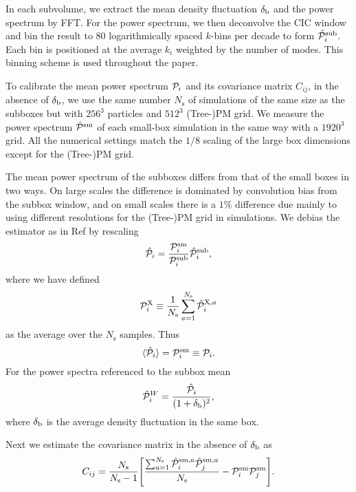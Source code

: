 \documentclass[prd,twocolumn,amsmath,amssymb,floatfix,superscriptaddress]{revtex4-1}
\newcommand{\br}{{\rm b}}
\newcommand{\Dv}{{\cal P}}
\begin{document}
{{In each subvolume, we extract the mean density fluctuation $\delta_\br$
and 
the power spectrum %
by FFT.   For the power spectrum, we then 
deconvolve the CIC window
and bin the result to 80 logarithmically spaced $k$-bins per decade to form 
$\hat \Dv^\textrm{sub}_i$. 
Each bin is positioned at the average $k_i$ weighted by the number of modes.
This binning scheme is used throughout the paper.

To calibrate the mean power spectrum $\Dv_i$ and its covariance matrix $C_{ij}$, in
the absence of $\delta_\br$, 
we use the same number $N_\textrm{s}$ of simulations
of 
the same size as the subboxes but with $256^3$ particles and $512^3$
(Tree-)PM grid.
{We measure the power}
spectrum $\hat \Dv^\textrm{sm}$ of each small-box simulation
in the same way with a $1920^3$ grid. 
All {the numerical}
settings match the $1/8$ scaling of the large box dimensions except
for the (Tree-)PM grid.

The mean power spectrum of the subboxes differs from that of the small boxes in two ways.
On large scales the difference is dominated by  convolution bias from the subbox window,
and on small scales there is a $1\%$ difference due mainly to
using different resolutions for the (Tree-)PM grid in simulations.
We debias the estimator as in Ref \cite{Lietal:14} by rescaling
\begin{equation}
    \hat \Dv_i = \frac{\Dv^\textrm{sm}_i}{\Dv^\textrm{sub}_i}  \hat \Dv^\textrm{sub}_i,
    \label{eq:debias}
\end{equation}
where we have defined 
\begin{equation}
    \Dv^\textrm{X}_i \equiv \frac{1}{N_\textrm{s}} \sum_{a=1}^{N_\textrm{s}}  \hat \Dv_i^{\textrm{X},a}
\end{equation}
as the average over the $N_\textrm{s}$ samples.  Thus 
\begin{equation}
    \langle \hat \Dv_i \rangle =  \Dv^\textrm{sm}_i \equiv  \Dv_i.
\end{equation}
For the power spectra referenced to the subbox mean
\begin{equation}
    \hat \Dv_i^W = \frac{\hat \Dv_i}{(1+\delta_\br)^2},
\end{equation}
where $\delta_\br$ is the average density fluctuation in the same box.

{Next we estimate}
the covariance matrix in the absence of $\delta_\br$ 
{as}
\begin{equation}
    C_{ij} = \frac{N_\textrm{s}}{N_\textrm{s}-1}
    \Bigg[ \frac{\sum_{a=1}^{N_\textrm{s}} \hat \Dv^{\textrm{sm}, a}_i \hat \Dv^{\textrm{sm},a}_j}{N_\textrm{s}}
    - \Dv^\textrm{sm}_i\Dv^\textrm{sm}_j  \Bigg].
\end{equation}

}}
\end{document}
